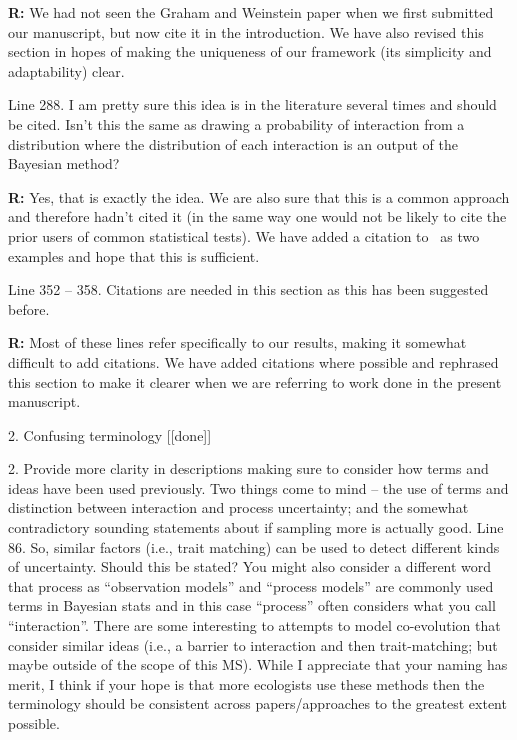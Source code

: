 \documentclass[12pt]{letter}
\newenvironment{refquote}{\bigskip \begin{it}}{\end{it}\smallskip}
\begin{document}
		\textbf{R:} We had not seen the Graham and Weinstein paper when we first submitted our manuscript, but now cite it in the introduction. We have also revised this section in hopes of making the uniqueness of our framework (its simplicity and adaptability) clear. 

		\begin{refquote}
		Line 288.  I am pretty sure this idea is in the literature several times and should be cited.  Isn’t this the same as drawing a probability of interaction from a distribution where the distribution of each interaction is an output of the Bayesian method?\\
		\end{refquote}

		\textbf{R:} Yes, that is exactly the idea. We are also sure that this is a common approach and therefore hadn't cited it (in the same way one would not be likely to cite the prior users of common statistical tests). We have added a citation to~\citet{Vazquez2005,Guimera2009} as two examples and hope that this is sufficient.

		\begin{refquote}
		Line 352 – 358.  Citations are needed in this section as this has been suggested before.
		\end{refquote}

		\textbf{R:} Most of these lines refer specifically to our results, making it somewhat difficult to add citations. We have added citations where possible and rephrased this section to make it clearer when we are referring to work done in the present manuscript.


	2. Confusing terminology [[done]]

		\begin{refquote}
		2.      Provide more clarity in descriptions making sure to consider how terms and ideas have been used previously.  Two things come to mind – the use of terms and distinction between interaction and process uncertainty; and the somewhat contradictory sounding statements about if sampling more is actually good.
		\medskip
		Line 86.  So, similar factors (i.e., trait matching) can be used to detect different kinds of uncertainty.  Should this be stated?  You might also consider a different word that process as “observation models” and “process models” are commonly used terms in Bayesian stats and in this case “process” often considers what you call “interaction”.  There are some interesting to attempts to model co-evolution that consider similar ideas (i.e., a barrier to interaction and then trait-matching; but maybe outside of the scope of this MS). While I appreciate that your naming has merit, I think if your hope is that more ecologists use these methods then the terminology should be consistent across papers/approaches to the greatest extent possible.
		\end{refquote}
\end{document}
